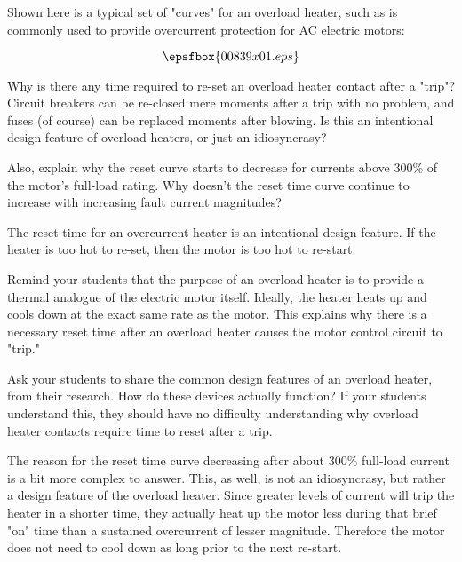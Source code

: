 

Shown here is a typical set of "curves" for an overload heater, such as is commonly used to provide overcurrent protection for AC electric motors:

$$\epsfbox{00839x01.eps}$$

Why is there any time required to re-set an overload heater contact after a "trip"?  Circuit breakers can be re-closed mere moments after a trip with no problem, and fuses (of course) can be replaced moments after blowing.  Is this an intentional design feature of overload heaters, or just an idiosyncrasy?

Also, explain why the reset curve starts to decrease for currents above 300\% of the motor's full-load rating.  Why doesn't the reset time curve continue to increase with increasing fault current magnitudes?







The reset time for an overcurrent heater is an intentional design feature.  If the heater is too hot to re-set, then the motor is too hot to re-start.







Remind your students that the purpose of an overload heater is to provide a thermal analogue of the electric motor itself.  Ideally, the heater heats up and cools down at the exact same rate as the motor.  This explains why there is a necessary reset time after an overload heater causes the motor control circuit to "trip."

Ask your students to share the common design features of an overload heater, from their research.  How do these devices actually function?  If your students understand this, they should have no difficulty understanding why overload heater contacts require time to reset after a trip.

The reason for the reset time curve decreasing after about 300\% full-load current is a bit more complex to answer.  This, as well, is not an idiosyncrasy, but rather a design feature of the overload heater.  Since greater levels of current will trip the heater in a shorter time, they actually heat up the motor less during that brief "on" time than a sustained overcurrent of lesser magnitude.  Therefore the motor does not need to cool down as long prior to the next re-start.  




